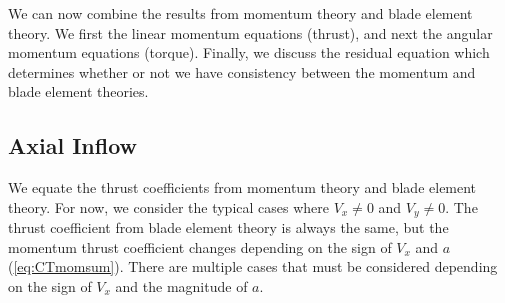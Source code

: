 We can now combine the results from momentum theory and blade element theory.  We first the linear momentum equations (thrust), and next the angular momentum equations (torque).  Finally, we discuss the residual equation which determines whether or not we have consistency between the momentum and blade element theories.

\subsection{Axial Inflow}

We equate the thrust coefficients from momentum theory and blade element theory.  For now, we consider the typical cases where $V_x \ne 0$ and $V_y \ne 0$.  The thrust coefficient from blade element theory is always the same, but the momentum thrust coefficient changes depending on the sign of $V_x$ and $a$ (\cref{eq:CTmomsum}).  There are multiple cases that must be considered depending on the sign of $V_x$ and the magnitude of $a$.

